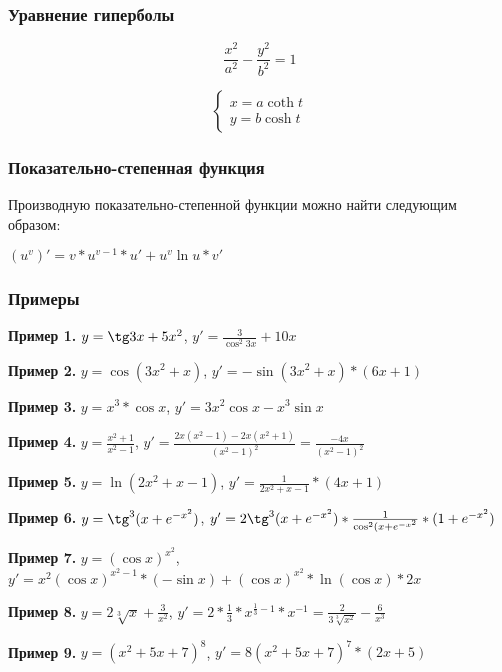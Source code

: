 \documentclass{article}
\begin{document}
\begin{flushleft}
\subsubsection{Уравнение гиперболы}

$$\frac{x^2}{a^2} - \frac{y^2}{b^2} = 1$$

\begin{equation}
    \begin{cases}
        x = a \coth t \\
        y = b \cosh t
    \end{cases}
\end{equation}

\subsubsection{Показательно-степенная функция}

Производную показательно-степенной функции можно найти следующим образом:

$(u^v)' = v * u^{v - 1} * u' + u^v \ln u * v'$

\subsubsection{Примеры}

\textbf{Пример 1.} $y = \tg 3x + 5x^2$, $y' = \frac{3}{\cos^{2} 3x} + 10x$

\hfill

\textbf{Пример 2.} $y = \cos (3x^2 + x)$, $y' = -\sin(3x^2 + x) * (6x + 1)$

\hfill

\textbf{Пример 3.} $y = x^3 * \cos x$, $y' = 3x^2 \cos x - x^3 \sin x$

\hfill

\textbf{Пример 4.} $y = \frac{x^2 + 1}{x^2 - 1}$, $y' = \frac{2x(x^2 - 1) - 2x(x^2 + 1)}{(x^2 - 1)^2} = \frac{-4x}{(x^2 - 1)^2}$

\hfill

\textbf{Пример 5.} $y = \ln (2x^2 + x - 1)$, $y' = \frac{1}{2x^2 + x - 1} * (4x + 1)$

\hfill

\textbf{Пример 6.} $y = \tg^3 (x + e^{-x^2})$, $y' = 2 \tg^3 (x + e^{-x^2}) * \frac{1}{\cos^2(x+e^{-x^2}} * (1 + e^{-x^2})$

\hfill

\textbf{Пример 7. } $y = (\cos x)^{x^2}$, $y' = x^2 (\cos x)^{x^2 - 1} * (-\sin x) + (\cos x)^{x^2} * \ln (\cos x) * 2x$

\hfill

\textbf{Пример 8.} $y = 2 \sqrt[3]{x} + \frac{3}{x^2}$, $y' = 2 * \frac{1}{3} * x^{\frac{1}{3} - 1} * x^{-1} = \frac{2}{3\sqrt[3]{x^2}} - \frac{6}{x^3}$

\hfill

\textbf{Пример 9.} $y = (x^2 + 5x + 7)^{8}$, $y' = 8(x^2 + 5x + 7)^{7} * (2x + 5)$

\end{flushleft}
\end{document}
